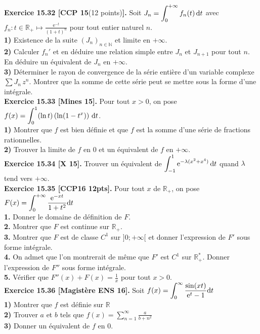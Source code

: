 \documentclass[a4paper,12pt,francais]{article}
\newcommand{\field}[1]{\mathbb{#1}}
\newcommand{\N}{\field{N}}
\newcommand{\R}{\field{R}}
\newcommand{\e}{\mbox{e}}
\begin{document}
\noindent  %
{\bf Exercice 15.32 [CCP 15}(12 points){\bf ].}
Soit $\displaystyle J_n= \int_0^{+\infty} f_n(t) \, {\rm d}t$ avec $\displaystyle f_n:t \in  \R_+ \mapsto \frac{\e^{-t}}{(1+t)^n}$ pour tout entier naturel $n$.\\
{\bf 1)} Existence de la suite $(J_n)_{n \in \N}$ et limite en $+\infty$.\\
{\bf 2)} Calculer $f_n'$ et en déduire une relation simple entre $J_n$ et $J_{n+1}$ pour tout $n$. En déduire un équivalent de $J_n$ en $+\infty$.\\
{\bf 3)} Déterminer le rayon de convergence de la série entière d'un variable complexe $\sum J_n \, z^n$. Montrer que la somme de cette série peut se mettre sous la forme d'une intégrale.\\

\noindent  %
{\bf Exercice 15.33 [Mines 15].} Pour tout $x>0$, on pose $\displaystyle f(x)=\int_0^1 (\ln t)\left( \ln ( 1-t^x) \right) \, {\rm d}t$.\\
{\bf 1)} Montrer que $f$ est bien définie et que $f$ est la somme d'une série de fractions rationnelles.\\
{\bf 2)} Trouver la limite de $f$ en $0$ et un équivalent de $f$ en $+\infty$.\\

\noindent  %
{\bf Exercice 15.34 [X 15].} Trouver un équivalent de $\displaystyle \int_{-1}^1 \e^{-\lambda(x^2+x^4)} \, {\rm d}t$ quand $\lambda$ tend vers $+\infty$.\\

\noindent  %
{\bf Exercice 15.35 [CCP16 12pts].}
Pour tout $x$ de $\R_+$, on pose $F(x) =\displaystyle \int_0^{+\infty} \frac{\e^{-xt}}{1+t^2} {\rm d} t$\\
{\bf 1.} Donner le domaine de définition de $F$.\\
{\bf 2.} Montrer que $F$ est continue sur $\R_+$.\\
{\bf 3.} Montrer que $F$ est de classe $C^1$ sur $]0;+\infty[$ et donner l'expression de $F'$ sous forme intégrale.\\
{\bf 4.} On admet que l'on montrerait de même que $F'$ est $C^1$ sur $\R_+^*$. Donner l'expression de $F''$ sous forme intégrale.\\
{\bf 5.} Vérifier que $F''(x)+F(x)=\frac{1}{x}$ pour tout $x>0$.\\

\noindent  %
{\bf Exercice 15.36 [Magistère ENS 16].}
Soit $\displaystyle f(x)= \int_0^\infty \frac{\sin(xt)}{\e^t-1} {\rm d}t$\\
{\bf 1)} Montrer que $f$ est définie sur $\R$\\
{\bf 2)} Trouver $a$ et $b$ tels que $\displaystyle f(x)=\sum_{n=1}^\infty \frac{a}{b+n^2}$\\
{\bf 3)} Donner un équivalent de $f$ en $0$.\\
\end{document}
